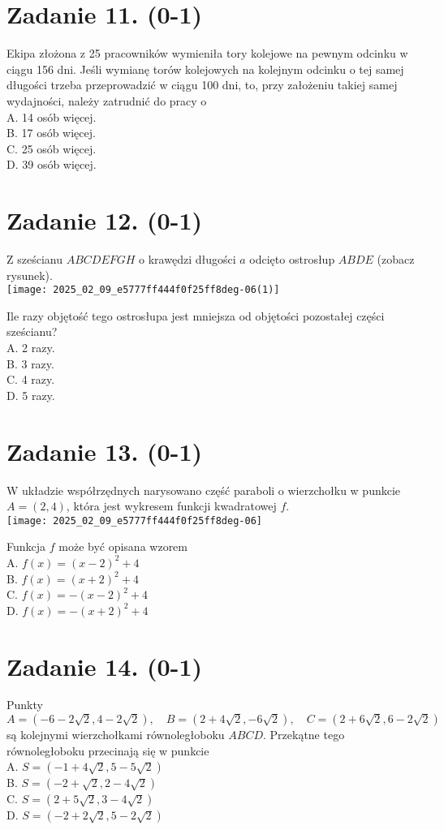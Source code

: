 \documentclass[10pt]{article}
\begin{document}
\section*{Zadanie 11. (0-1)}
Ekipa złożona z 25 pracowników wymieniła tory kolejowe na pewnym odcinku w ciągu 156 dni. Jeśli wymianę torów kolejowych na kolejnym odcinku o tej samej długości trzeba przeprowadzić w ciągu 100 dni, to, przy założeniu takiej samej wydajności, należy zatrudnić do pracy o\\
A. 14 osób więcej.\\
B. 17 osób więcej.\\
C. 25 osób więcej.\\
D. 39 osób więcej.

\section*{Zadanie 12. (0-1)}
Z sześcianu \(A B C D E F G H\) o krawędzi długości \(a\) odcięto ostrosłup \(A B D E\) (zobacz rysunek).\\
\texttt{[image: 2025\_02\_09\_e5777ff444f0f25ff8deg-06(1)]}

Ile razy objętość tego ostrosłupa jest mniejsza od objętości pozostałej części sześcianu?\\
A. 2 razy.\\
B. 3 razy.\\
C. 4 razy.\\
D. 5 razy.

\section*{Zadanie 13. (0-1)}
W układzie współrzędnych narysowano część paraboli o wierzchołku w punkcie \(A=(2,4)\), która jest wykresem funkcji kwadratowej \(f\).\\
\texttt{[image: 2025\_02\_09\_e5777ff444f0f25ff8deg-06]}

Funkcja \(f\) może być opisana wzorem\\
A. \(f(x)=(x-2)^{2}+4\)\\
B. \(f(x)=(x+2)^{2}+4\)\\
C. \(f(x)=-(x-2)^{2}+4\)\\
D. \(f(x)=-(x+2)^{2}+4\)

\section*{Zadanie 14. (0-1)}
Punkty \(A=(-6-2 \sqrt{2}, 4-2 \sqrt{2}), \quad B=(2+4 \sqrt{2},-6 \sqrt{2}), \quad C=(2+6 \sqrt{2}, 6-2 \sqrt{2})\) są kolejnymi wierzchołkami równoległoboku \(A B C D\). Przekątne tego równoległoboku przecinają się w punkcie\\
A. \(S=(-1+4 \sqrt{2}, 5-5 \sqrt{2})\)\\
B. \(S=(-2+\sqrt{2}, 2-4 \sqrt{2})\)\\
C. \(S=(2+5 \sqrt{2}, 3-4 \sqrt{2})\)\\
D. \(S=(-2+2 \sqrt{2}, 5-2 \sqrt{2})\)
\end{document}
